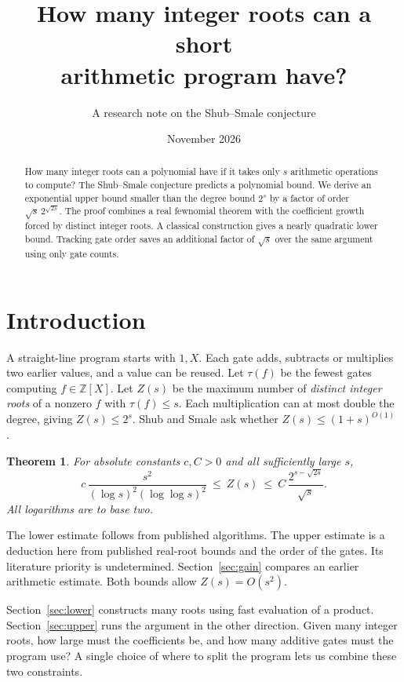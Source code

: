 \documentclass[11pt,letterpaper]{article}
\title{\bfseries How many integer roots can a short\\arithmetic program have?}
\author{A research note on the Shub--Smale conjecture}
\date{November 2026}
\newtheorem{theorem}{Theorem}
\newcommand{\Z}{\mathbb Z}
\begin{document}
\maketitle
\begin{abstract}
How many integer roots can a polynomial have if it takes only \(s\)
arithmetic operations to compute? The Shub--Smale conjecture predicts a
polynomial bound. We derive an exponential upper bound smaller than the
degree bound \(2^s\) by a factor of order \(\sqrt{s}\,2^{\sqrt{2s}}\).
The proof combines a real fewnomial theorem with the coefficient growth
forced by distinct integer roots. A classical construction gives a nearly
quadratic lower bound. Tracking gate order saves an additional factor of
\(\sqrt{s}\) over the same argument using only gate counts.
\end{abstract}

\section{Introduction}\label{sec:intro}
A straight-line program starts with \(1,X\). Each gate adds, subtracts or
multiplies two earlier values, and a value can be reused. Let \(\tau(f)\)
be the fewest gates computing \(f\in\Z[X]\). Let \(Z(s)\) be the maximum
number of \emph{distinct integer roots} of a nonzero \(f\) with \(\tau(f)\le s\).
Each multiplication can at most double the degree, giving \(Z(s)\le 2^s\).
Shub and Smale ask whether \(Z(s)\le (1+s)^{O(1)}\) \cite{SS,Smale}.

\begin{theorem}\label{thm:bounds}
For absolute constants \(c,C>0\) and all sufficiently large \(s\),
\[
 c\,\frac{s^2}{(\log s)^2(\log\log s)^2}
 \ \le\ Z(s)\ \le\
 C\,\frac{2^{s-\sqrt{2s}}}{\sqrt{s}} .
\]
All logarithms are to base two.
\end{theorem}

The lower estimate follows from published algorithms. The upper estimate
is a deduction here from published real-root bounds and the order of the
gates. Its literature priority is undetermined. Section~\ref{sec:gain} compares an earlier arithmetic estimate. Both bounds allow
\(Z(s)=O(s^2)\).

Section~\ref{sec:lower} constructs many roots using fast evaluation of a
product. Section~\ref{sec:upper} runs the argument in the other direction.
Given many integer roots, how large must the coefficients be, and how
many additive gates must the program use? A single choice of where to
split the program lets us combine these two constraints.
\end{document}
